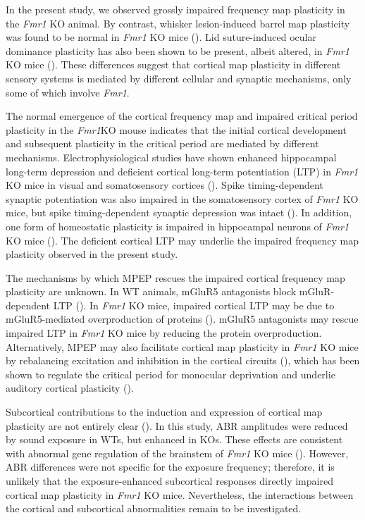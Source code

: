 In the present study, we observed grossly impaired frequency map plasticity in the \textit{Fmr1} KO animal. By contrast, whisker lesion-induced barrel map plasticity was found to be normal in \textit{Fmr1} KO mice (\cite{Harlow2010}). Lid suture-induced ocular dominance plasticity has also been shown to be present, albeit altered, in \textit{Fmr1} KO mice (\cite{Dolen2007}). These differences suggest that cortical map plasticity in different sensory systems is mediated by different cellular and synaptic mechanisms, only some of which involve \textit{Fmr1}.

The normal emergence of the cortical frequency map and impaired critical period plasticity in the \textit{Fmr1}KO mouse indicates that the initial cortical development and subsequent plasticity in the critical period are mediated by different mechanisms. Electrophysiological studies have shown enhanced hippocampal long-term depression and deficient cortical long-term potentiation (LTP) in \textit{Fmr1} KO mice in visual and somatosensory cortices (\cite{Li2002, Zhao2005, Wilson2007}). Spike timing-dependent synaptic potentiation was also impaired in the somatosensory cortex of \textit{Fmr1} KO mice, but spike timing-dependent synaptic depression was intact (\cite{Desai2006, Meredith2007}). In addition, one form of homeostatic plasticity is impaired in hippocampal neurons of \textit{Fmr1} KO mice (\cite{Soden2010}). The deficient cortical LTP may underlie the impaired frequency map plasticity observed in the present study.

The mechanisms by which MPEP rescues the impaired cortical frequency map plasticity are unknown. In WT animals, mGluR5 antagonists block mGluR-dependent LTP (\cite{Wang2003, Wilson2007}). In \textit{Fmr1} KO mice, impaired cortical LTP may be due to mGluR5-mediated overproduction of proteins (\cite{Dolen2007, Dolen2008}). mGluR5 antagonists may rescue impaired LTP in \textit{Fmr1} KO mice by reducing the protein overproduction. Alternatively, MPEP may also facilitate cortical map plasticity in \textit{Fmr1} KO mice by rebalancing excitation and inhibition in the cortical circuits (\cite{Chuang2005, Selby2007, Curia2009}), which has been shown to regulate the critical period for monocular deprivation and underlie auditory cortical plasticity (\cite{Hensch2004, Dorrn2010}).

Subcortical contributions to the induction and expression of cortical map plasticity are not entirely clear (\cite{Barkat2011, Oliver2011, Miyakawa2013}). In this study, ABR amplitudes were reduced by sound exposure in WTs, but enhanced in KOs. These effects are consistent with abnormal gene regulation of the brainstem of \textit{Fmr1} KO mice (\cite{Strumbos2010}). However, ABR differences were not specific for the exposure frequency; therefore, it is unlikely that the exposure-enhanced subcortical responses directly impaired cortical map plasticity in \textit{Fmr1} KO mice. Nevertheless, the interactions between the cortical and subcortical abnormalities remain to be investigated.

